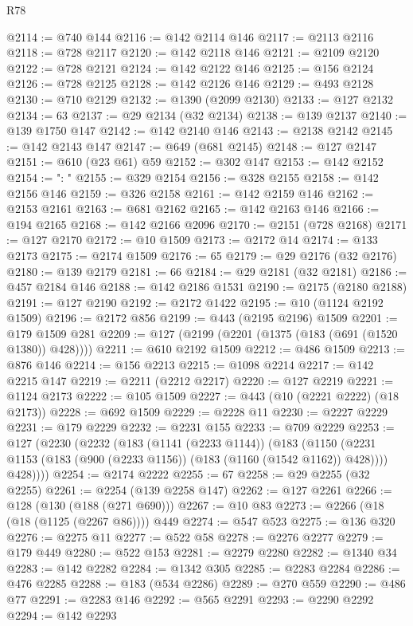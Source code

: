 \begin{lexlean}{R78}
\begin{coremodule}
@2114 := @740 @144
@2116 := @142 @2114 @146
@2117 := @2113 @2116
@2118 := @728 @2117
@2120 := @142 @2118 @146
@2121 := @2109 @2120
@2122 := @728 @2121
@2124 := @142 @2122 @146
@2125 := @156 @2124
@2126 := @728 @2125
@2128 := @142 @2126 @146
@2129 := @493 @2128
@2130 := @710 @2129
@2132 := @1390 (@2099 @2130)
@2133 := @127 @2132
@2134 := 63
@2137 := @29 @2134 (@32 @2134)
@2138 := @139 @2137
@2140 := @139 @1750 @147
@2142 := @142 @2140 @146
@2143 := @2138 @2142
@2145 := @142 @2143 @147
@2147 := @649 (@681 @2145)
@2148 := @127 @2147
@2151 := @610 (@23 @61) @59
@2152 := @302 @147
@2153 := @142 @2152
@2154 := ": "
@2155 := @329 @2154
@2156 := @328 @2155
@2158 := @142 @2156 @146
@2159 := @326 @2158
@2161 := @142 @2159 @146
@2162 := @2153 @2161
@2163 := @681 @2162
@2165 := @142 @2163 @146
@2166 := @194 @2165
@2168 := @142 @2166 @2096
@2170 := @2151 (@728 @2168)
@2171 := @127 @2170
@2172 := @10 @1509
@2173 := @2172 @14
@2174 := @133 @2173
@2175 := @2174 @1509
@2176 := 65
@2179 := @29 @2176 (@32 @2176)
@2180 := @139 @2179
@2181 := 66
@2184 := @29 @2181 (@32 @2181)
@2186 := @457 @2184 @146
@2188 := @142 @2186 @1531
@2190 := @2175 (@2180 @2188)
@2191 := @127 @2190
@2192 := @2172 @1422
@2195 := @10 (@1124 @2192 @1509)
@2196 := @2172 @856
@2199 := @443 (@2195 @2196) @1509
@2201 := @179 @1509 @281
@2209 := @127 (@2199 (@2201 (@1375 (@183 (@691 (@1520 @1380)) @428))))
@2211 := @610 @2192 @1509
@2212 := @486 @1509
@2213 := @876 @146
@2214 := @156 @2213
@2215 := @1098 @2214
@2217 := @142 @2215 @147
@2219 := @2211 (@2212 @2217)
@2220 := @127 @2219
@2221 := @1124 @2173
@2222 := @105 @1509
@2227 := @443 (@10 (@2221 @2222) (@18 @2173))
@2228 := @692 @1509
@2229 := @2228 @11
@2230 := @2227 @2229
@2231 := @179 @2229
@2232 := @2231 @155
@2233 := @709 @2229
@2253 := @127
    (@2230
      (@2232
        (@183
          (@1141 (@2233 @1144))
          (@183
            (@1150 (@2231 @1153 (@183 (@900 (@2233 @1156)) (@183 (@1160 (@1542 @1162)) @428))))
            @428))))
@2254 := @2174 @2222
@2255 := 67
@2258 := @29 @2255 (@32 @2255)
@2261 := @2254 (@139 @2258 @147)
@2262 := @127 @2261
@2266 := @128 (@130 (@188 (@271 @690)))
@2267 := @10 @83
@2273 := @2266 (@18 (@18 (@1125 (@2267 @86)))) @449
@2274 := @547 @523
@2275 := @136 @320
@2276 := @2275 @11
@2277 := @522 @58
@2278 := @2276 @2277
@2279 := @179 @449
@2280 := @522 @153
@2281 := @2279 @2280
@2282 := @1340 @34
@2283 := @142 @2282
@2284 := @1342 @305
@2285 := @2283 @2284
@2286 := @476 @2285
@2288 := @183 (@534 @2286)
@2289 := @270 @559
@2290 := @486 @77
@2291 := @2283 @146
@2292 := @565 @2291
@2293 := @2290 @2292
@2294 := @142 @2293

\end{coremodule}
\end{lexlean}
